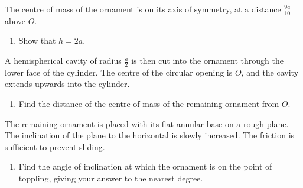 \documentclass[leqno]{article}
\begin{document}
\begin{enumerate}[
  label=\textbf{\arabic*.},
  leftmargin=*,
  topsep=0pt,
  partopsep=0pt,
  parsep=0pt
]
The centre of mass of the ornament is on its axis of symmetry, at a distance $\frac{9a}{10}$ above $O$. \\
\begin{enumerate}[label=\textbf{(\alph*)}]
\item Show that $h=2a$.  \\
\end{enumerate}
A hemispherical cavity of radius $\frac{a}{2}$ is then cut into the ornament through the lower face of the cylinder. The centre of the circular opening is $O$, and the cavity extends upwards into the cylinder. \\
\begin{enumerate}[label=\textbf{(\alph*)}, resume]
\item Find the distance of the centre of mass of the remaining ornament from $O$.  \\
\end{enumerate}
The remaining ornament is placed with its flat annular base on a rough plane. The inclination of the plane to the horizontal is slowly increased. The friction is sufficient to prevent sliding. \\
\begin{enumerate}[label=\textbf{(\alph*)}, resume]
\item Find the angle of inclination at which the ornament is on the point of toppling, giving your answer to the nearest degree.  \\
\end{enumerate}

\newpage

\questionitem


\end{enumerate}
\end{document}
